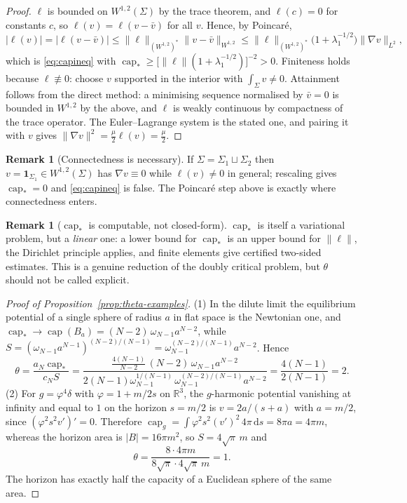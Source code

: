 \documentclass[11pt,reqno]{amsart}
\theoremstyle{plain}
\theoremstyle{definition}
\newtheorem{remark}[theorem]{Remark}
\newcommand{\R}{\mathbb{R}}
\newcommand{\aN}{a_N}
\newcommand{\cN}{c_N}
\newcommand{\cpstar}{\operatorname{cap}_{*}}
\newcommand{\dd}{\,\mathrm{d}}
\begin{document}
\begin{proof}
$\ell$ is bounded on $W^{1,2}(\Sigma)$ by the trace theorem, and $\ell(c)=0$ for
constants $c$, so $\ell(v)=\ell(v-\bar v)$ for all $v$. Hence, by Poincaré,
\[
  |\ell(v)|=|\ell(v-\bar v)|\le\|\ell\|_{(W^{1,2})^*}\|v-\bar v\|_{W^{1,2}}
  \le\|\ell\|_{(W^{1,2})^*}\bigl(1+\lambda_1^{-1/2}\bigr)\|\nabla v\|_{L^2},
\]
which is \eqref{eq:capineq} with
$\cpstar\ge\bigl[\|\ell\|(1+\lambda_1^{-1/2})\bigr]^{-2}>0$. Finiteness holds
because $\ell\not\equiv0$: choose $v$ supported in the interior with
$\int_\Sigma v\ne0$. Attainment follows from the direct method: a minimising
sequence normalised by $\bar v=0$ is bounded in $W^{1,2}$ by the above, and $\ell$
is weakly continuous by compactness of the trace operator. The Euler--Lagrange
system is the stated one, and pairing it with $v$ gives
$\|\nabla v\|^2=\tfrac{\mu}{2}\ell(v)=\tfrac{\mu}{2}$.
\end{proof}

\begin{remark}[Connectedness is necessary]
\label{rem:connected}
If $\Sigma=\Sigma_1\sqcup\Sigma_2$ then $v=\mathbf 1_{\Sigma_1}\in W^{1,2}(\Sigma)$
has $\nabla v\equiv0$ while $\ell(v)\ne0$ in general; rescaling gives
$\cpstar=0$ and \eqref{eq:capineq} is false. The Poincaré step above is exactly
where connectedness enters.
\end{remark}

\begin{remark}[$\cpstar$ is computable, not closed-form]
\label{rem:capcomputable}
$\cpstar$ is itself a variational problem, but a \emph{linear} one: a lower bound
for $\cpstar$ is an upper bound for $\|\ell\|$, the Dirichlet principle applies,
and finite elements give certified two-sided estimates. This is a genuine
reduction of the doubly critical problem, but $\theta$ should not be called
explicit.
\end{remark}

\begin{proof}[Proof of Proposition~\ref{prop:theta-examples}]
(1) In the dilute limit the equilibrium potential of a single sphere of radius $a$
in flat space is the Newtonian one, and
$\cpstar\to\operatorname{cap}(B_a)=(N-2)\,\omega_{N-1}a^{N-2}$, while
$S=(\omega_{N-1}a^{N-1})^{(N-2)/(N-1)}=\omega_{N-1}^{(N-2)/(N-1)}a^{N-2}$. Hence
\[
  \theta=\frac{\aN\cpstar}{\cN S}
   =\frac{\tfrac{4(N-1)}{N-2}\,(N-2)\,\omega_{N-1}a^{N-2}}
         {2(N-1)\omega_{N-1}^{1/(N-1)}\,\omega_{N-1}^{(N-2)/(N-1)}a^{N-2}}
   =\frac{4(N-1)}{2(N-1)}=2 .
\]
(2) For $g=\varphi^4\delta$ with $\varphi=1+m/2s$ on $\R^3$, the $g$-harmonic
potential vanishing at infinity and equal to $1$ on the horizon $s=m/2$ is
$v=2a/(s+a)$ with $a=m/2$, since $(\varphi^2s^2v')'=0$. Therefore
$\operatorname{cap}_g=\int\varphi^2s^2(v')^2\,4\pi\dd s=8\pi a=4\pi m$, whereas the
horizon area is $|B|=16\pi m^2$, so $S=4\sqrt\pi\,m$ and
\[
  \theta=\frac{8\cdot4\pi m}{8\sqrt\pi\cdot4\sqrt\pi\,m}=1 .
\]
The horizon has exactly half the capacity of a Euclidean sphere of the same area.
\end{proof}
\end{document}
